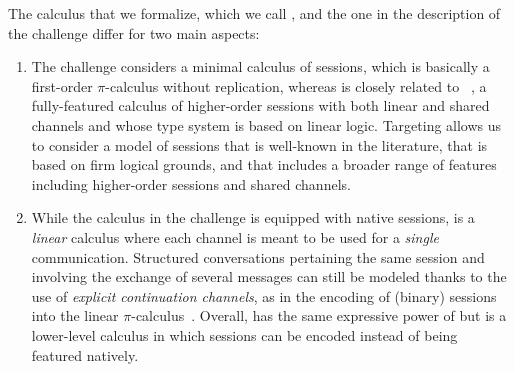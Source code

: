 The calculus that we formalize, which we call \Calculus, and the one in the
description of the challenge differ for two main aspects:
\begin{enumerate}
\item The challenge considers a minimal calculus of sessions, which is basically
    a first-order $\pi$-calculus without replication, whereas \Calculus is
    closely related to
    \CP~\citep{CairesPfenning10,Wadler14,CairesPfenningToninho16}, a
    fully-featured calculus of higher-order sessions with both linear and shared
    channels and whose type system is based on linear logic.
    Targeting \Calculus allows us to consider a model of sessions that is
    well-known in the literature, that is based on firm logical grounds, and
    that includes a broader range of features including higher-order sessions
    and shared channels.
\item While the calculus in the challenge is equipped with native sessions,
    \Calculus is a \emph{linear} calculus where each channel is meant to be used
    for a \emph{single} communication. Structured conversations pertaining the
    same session and involving the exchange of several messages can still be
    modeled thanks to the use of \emph{explicit continuation channels}, as in
    the encoding of (binary) sessions into the linear
    $\pi$-calculus~\citep{KobayashiPierceTurner99,Kobayashi02b,DardhaGiachinoSangiorgi17}.
    Overall, \Calculus has the same expressive power of \CP but is a lower-level
    calculus in which sessions can be encoded instead of being featured
    natively.
\end{enumerate}


